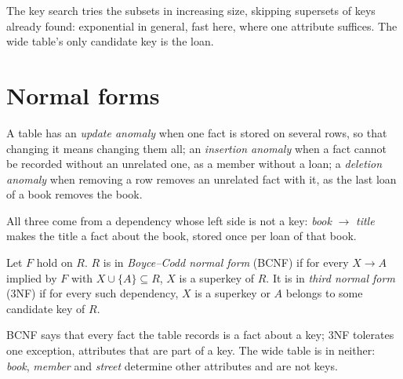 \label{lst:b2:database-design:rules}

\label{out:b2:database-design:fd-demo}

The key search tries the subsets in increasing size, skipping supersets of keys already found: exponential in general,
fast here, where one attribute suffices. The wide table's only candidate key is the loan.

\section{Normal forms}\label{sec:b2:database-design:normal-forms}

\begin{definition}\label{def:b2:database-design:anomaly}
A table has an \emph{update anomaly} when one fact is stored on several rows, so that changing it
means changing them all; an \emph{insertion anomaly} when a fact cannot be recorded without an
unrelated one, as a member without a loan; a \emph{deletion anomaly} when removing a row removes
an unrelated fact with it, as the last loan of a book removes the book.
\end{definition}

All three come from a dependency whose left side is not a key: \emph{book} $\to$ \emph{title} makes the title a fact
about the book, stored once per loan of that book.

\begin{definition}\label{def:b2:database-design:normal-forms}
Let $F$ hold on $R$. $R$ is in \emph{Boyce--Codd normal form} (BCNF) if for every
 $X \to A$ implied by $F$ with $X \cup \{A\} \subseteq R$, $X$ is a superkey of $R$. It is in \emph{third
normal form} (3NF) if for every such dependency, $X$ is a superkey or $A$ belongs to some
candidate key of $R$.
\end{definition}

BCNF says that every fact the table records is a fact about a key; 3NF tolerates one exception, attributes that are
part of a key. The wide table is in neither: \emph{book}, \emph{member} and \emph{street} determine other attributes and
are not keys.

